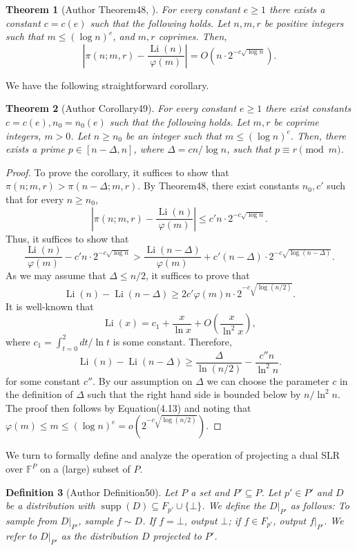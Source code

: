 \documentclass[10pt,a4paper]{article}
\newtheorem{nttheorem}{Theorem}
\newtheorem{ntdefinition}[nttheorem]{Definition}
\begin{document}
\begin{nttheorem}[Author Theorem48, {\cite{ref34,ref37}}]
For every constant $e\geq1$ there exists a constant $c=c(e)$ such that the following holds. Let $n,m,r$ be positive integers such that $m\leq(\log n)^e$, and $m,r$ coprimes. Then,
\[\left|\pi(n;m,r)-\frac{\operatorname{Li}(n)}{\varphi(m)}\right|=O\left(n\cdot2^{-c\sqrt{\log n}}\right).\]
\end{nttheorem}
We have the following straightforward corollary.
\begin{nttheorem}[Author Corollary49]
For every constant $e\geq1$ there exist constants $c=c(e),n_0=n_0(e)$ such that the following holds. Let $m,r$ be coprime integers, $m>0$. Let $n\geq n_0$ be an integer such that $m\leq(\log n)^e$. Then, there exists a prime $p\in[n-\Delta,n]$, where $\Delta=cn/\log n$, such that $p\equiv r\pmod m$.
\end{nttheorem}
\begin{proof}
To prove the corollary, it suffices to show that $\pi(n;m,r)>\pi(n-\Delta;m,r)$. By Theorem48, there exist constants $n_0,c'$ such that for every $n\geq n_0$,
\[\left|\pi(n;m,r)-\frac{\operatorname{Li}(n)}{\varphi(m)}\right|\leq c'n\cdot2^{-c\sqrt{\log n}}.\]
Thus, it suffices to show that
\[\frac{\operatorname{Li}(n)}{\varphi(m)}-c'n\cdot2^{-c\sqrt{\log n}}>\frac{\operatorname{Li}(n-\Delta)}{\varphi(m)}+c'(n-\Delta)\cdot2^{-c\sqrt{\log(n-\Delta)}}.\]
As we may assume that $\Delta\leq n/2$, it suffices to prove that
\begin{equation}\operatorname{Li}(n)-\operatorname{Li}(n-\Delta)\geq2c'\varphi(m)n\cdot2^{-c\sqrt{\log(n/2)}}.\tag{4.13}\end{equation}
It is well-known that
\[\operatorname{Li}(x)=c_1+\frac x{\ln x}+O\left(\frac x{\ln^2x}\right),\]
where $c_1=\int_{t=0}^2dt/\ln t$ is some constant. Therefore,
\[\operatorname{Li}(n)-\operatorname{Li}(n-\Delta)\geq\frac\Delta{\ln(n/2)}-\frac{c''n}{\ln^2n}.\]
for some constant $c''$. By our assumption on $\Delta$ we can choose the parameter $c$ in the definition of $\Delta$ such that the right hand side is bounded below by $n/\ln^2n$. The proof then follows by Equation(4.13) and noting that $\varphi(m)\leq m\leq(\log n)^e=o(2^{-c\sqrt{\log(n/2)}})$.
\end{proof}
We turn to formally define and analyze the operation of projecting a dual SLR over $\mathbb F^P$ on a (large) subset of $P$.
\begin{ntdefinition}[Author Definition50]
Let $P$ a set and $P'\subseteq P$. Let $p'\in P'$ and $D$ be a distribution with $\operatorname{supp}(D)\subseteq F_{p'}\cup\{\bot\}$. We define the $D|_{P'}$ as follows: To sample from $D|_{P'}$, sample $f\sim D$. If $f=\bot$, output $\bot$; if $f\in F_{p'}$, output $f|_{P'}$. We refer to $D|_{P'}$ as the distribution $D$ projected to $P'$.
\end{ntdefinition}
\end{document}
